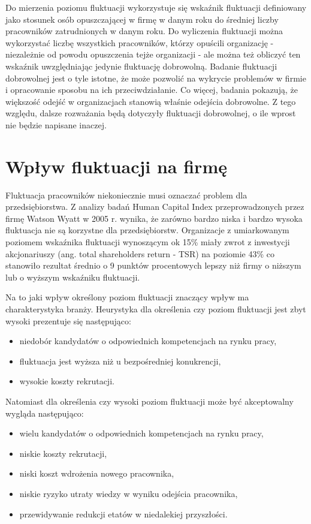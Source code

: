 Do mierzenia poziomu fluktuacji wykorzystuje się wskaźnik fluktuacji definiowany jako stosunek osób opuszczającej w firmę w danym roku do średniej liczby pracowników zatrudnionych w danym roku.
Do wyliczenia fluktuacji można wykorzystać liczbę wszystkich pracowników, którzy opuścili organizację - niezależnie od powodu opuszczenia tejże organizacji - ale można też obliczyć ten wskaźnik uwzględniając jedynie fluktuację dobrowolną.
Badanie fluktuacji dobrowolnej jest o tyle istotne, że może pozwolić na wykrycie problemów w firmie i opracowanie sposobu na ich przeciwdziałanie\cite{spychala-2019}.
Co więcej, badania pokazują, że większość odejść w organizacjach stanowią właśnie odejścia dobrowolne\cite{dalton-1982}.
Z tego względu, dalsze rozważania będą dotyczyły fluktuacji dobrowolnej, o ile wprost nie będzie napisane inaczej.


\section{Wpływ fluktuacji na firmę}\label{sec:wplyw-fluktuacji-na-firme}
Fluktuacja pracowników niekoniecznie musi oznaczać problem dla przedsiębiorstwa.
Z analizy badań Human Capital Index przeprowadzonych przez firmę Watson Wyatt w 2005 r. wynika,
że zarówno bardzo niska i bardzo wysoka fluktuacja nie są korzystne dla przedsiębiorstw.
Organizacje z umiarkowanym poziomem wskaźnika fluktuacji wynoszącym ok 15\%
miały zwrot z inwestycji akcjonariuszy (ang. total shareholders return - TSR) na poziomie 43\%
co stanowiło rezultat średnio o 9 punktów procentowych lepszy niż firmy o niższym lub o wyższym wskaźniku fluktuacji\cite{krol-ludwiczynski-2006}.

Na to jaki wpływ określony poziom fluktuacji znaczący wpływ ma charakterystyka branży.\cite{taylor-2006}
Heurystyka dla określenia czy poziom fluktuacji jest zbyt wysoki prezentuje się następująco:
\begin{itemize}
    \item niedobór kandydatów o odpowiednich kompetencjach na rynku pracy,
    \item fluktuacja jest wyższa niż u bezpośredniej konukrencji,
    \item wysokie koszty rekrutacji.
\end{itemize}
Natomiast dla określenia czy wysoki poziom fluktuacji może być akceptowalny wygląda następująco:
\begin{itemize}
    \item wielu kandydatów o odpowiednich kompetencjach na rynku pracy,
    \item niskie koszty rekrutacji,
    \item niski koszt wdrożenia nowego pracownika,
    \item niskie ryzyko utraty wiedzy w wyniku odejścia pracownika,
    \item przewidywanie redukcji etatów w niedalekiej przyszłości.
\end{itemize}


